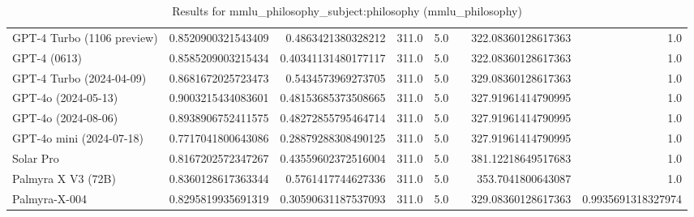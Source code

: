 \begin{table}[htp]
{\begin{tabular}{lrrrrrrr}
GPT-4 Turbo (1106 preview) & 0.8520900321543409 & 0.4863421380328212 & 311.0 & 5.0 &  & 322.08360128617363 & 1.0 \\
GPT-4 (0613) & 0.8585209003215434 & 0.40341131480177117 & 311.0 & 5.0 &  & 322.08360128617363 & 1.0 \\
GPT-4 Turbo (2024-04-09) & 0.8681672025723473 & 0.5434573969273705 & 311.0 & 5.0 &  & 329.08360128617363 & 1.0 \\
GPT-4o (2024-05-13) & 0.9003215434083601 & 0.48153685373508665 & 311.0 & 5.0 &  & 327.91961414790995 & 1.0 \\
GPT-4o (2024-08-06) & 0.8938906752411575 & 0.48272855795464714 & 311.0 & 5.0 &  & 327.91961414790995 & 1.0 \\
GPT-4o mini (2024-07-18) & 0.7717041800643086 & 0.28879288308490125 & 311.0 & 5.0 &  & 327.91961414790995 & 1.0 \\
Solar Pro & 0.8167202572347267 & 0.43559602372516004 & 311.0 & 5.0 &  & 381.12218649517683 & 1.0 \\
Palmyra X V3 (72B) & 0.8360128617363344 & 0.5761417744627336 & 311.0 & 5.0 &  & 353.7041800643087 & 1.0 \\
Palmyra-X-004 & 0.8295819935691319 & 0.30590631187537093 & 311.0 & 5.0 &  & 329.08360128617363 & 0.9935691318327974 \\
\bottomrule
\end{tabular}}
\caption{Results for mmlu_philosophy_subject:philosophy (mmlu_philosophy)}
\label{fig:mmlu_philosophy_subject:philosophy (mmlu_philosophy)}
\end{table}